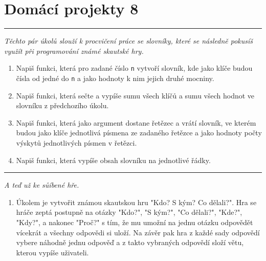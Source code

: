 \documentclass[a4paper,10pt]{article}
\newcommand\plsetno{8}
\newcommand\startsection[1]{
     \vspace{0.2ex}
    \hrule
    {\fontspec{Oxygen} \tiny
     \vspace{-1ex}
     \emph{#1}
     \vspace{-1.5em}
    }
}
\begin{document}
\section*{Domácí projekty \plsetno}

\startsection{Těchto pár úkolů slouží k procvičení práce se slovníky, které se
    následně pokusíš využít při programování známé skautské hry.}

\begin{enumerate}

\item Napiš funkci, která pro zadané číslo \texttt{n} vytvoří slovník, kde jako klíče
    budou čísla od jedné do \texttt{n} a jako hodnoty k nim jejich druhé mocniny.

\item Napiš funkci, která sečte a vypíše sumu všech klíčů a sumu všech hodnot
    ve slovníku z předchozího úkolu.

\item Napiš funkci, která jako argument dostane řetězec a vrátí slovník, ve kterém
    budou jako klíče jednotlivá písmena ze zadaného řetězce a jako hodnoty počty
    výskytů jednotlivých písmen v řetězci.

\item Napiš funkci, která vypíše obsah slovníku na jednotlivé řádky.

\end{enumerate}

\startsection{A teď už ke sůíbené hře.}

\begin{enumerate}[resume]

\item Úkolem je vytvořit známou skautskou hru "Kdo? S kým? Co dělali?". Hra se
    hráče zeptá postupně na otázky "Kdo?", "S kým?", "Co dělali?", "Kde?", "Kdy?",
    a nakonec "Proč?" s tím, že mu umožní na jednu otázku odpovědět vícekrát a
    všechny odpovědi si uloží. Na závěr pak hra z každé sady odpovědí vybere
    náhodně jednu odpověď a z takto vybraných odpovědí složí větu, kterou vypíše
    uživateli.

\end{enumerate}
\end{document}
